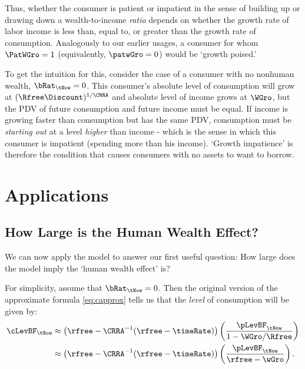 Thus, whether the consumer is patient or impatient in the sense of
building up or drawing down a wealth-to-income {\it ratio} depends on
whether the growth rate of labor income is less than, equal to, or
greater than the growth rate of consumption.  Analogously to our
earlier usages, a consumer for whom $\PatWGro=1$ (equivalently, $\patwGro= 0$) would be `growth poised.'

To get the intuition for this, consider the case of a consumer with no
nonhuman wealth, $\bRat_{\tNow}=0$.  This consumer's absolute level of
consumption will grow at $(\Rfree\Discount)^{1/\CRRA}$ and absolute
level of income grows at ${\WGro}$, but the PDV of future consumption
and future income must be equal.  If income is growing faster
than consumption but has the same PDV, consumption must be {\it starting
out} at a level {\it higher} than income - which is the sense in
which this consumer is impatient (spending more than his income).  `Growth impatience' is
therefore the condition that causes consumers with no assets to want to borrow.

\section{Applications}

\subsection{How Large is the Human Wealth Effect?} \label{subsec:HWEffect}

We can now apply the model to answer our first useful question: How large does the model
imply the `human wealth effect' is?

For simplicity, assume that $\bRat_{\tNow} = 0$.  Then the original
version of the approximate formula \eqref{eq:capprox} tells us that the
{\it level} of consumption will be given by:
\begin{equation}\begin{gathered}\begin{aligned}
        \cLevBF_{\tNow} & \approx  \left(\rfree - \CRRA^{-1}(\rfree-\timeRate)\right)\left(\frac{\pLevBF_{\tNow}}{1-{\WGro}/\Rfree}\right)  \\
         & \approx  \left(\rfree - \CRRA^{-1}(\rfree-\timeRate)\right)\left(\frac{\pLevBF_{\tNow}}{\rfree-\wGro}\right). \label{eq:cofw2}
\end{aligned}\end{gathered}\end{equation}

